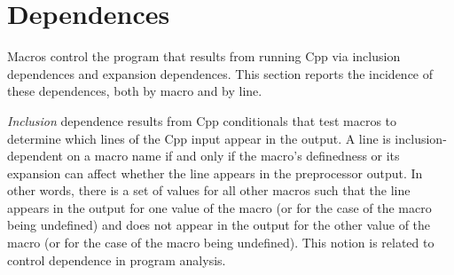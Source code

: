\documentclass[10pt]{article}
\newcommand{\captionsmall}[1]{\caption[]{\small #1}}
\begin{document}
% 
% 
% 



\section{Dependences}
\label{sec:dependence}
\label{sec:last-content-section}

Macros control the program that results from running Cpp via inclusion
dependences and expansion dependences.  This section reports the incidence
of these dependences, both by macro and by line.

\emph{Inclusion} dependence results from Cpp conditionals that test macros
to determine which lines of the Cpp input appear in the output.  A line is
inclusion-dependent on a macro name if and only if the macro's definedness
or its expansion can affect whether the line appears in the preprocessor
output.  In other words, there is a set of values for all other macros such
that the line appears in the output for one value of the macro (or for the
case of the macro being undefined) and does not appear in the output for
the other value of the macro (or for the case of the macro being
undefined).  This notion is related to control dependence in program
analysis.
\end{document}
